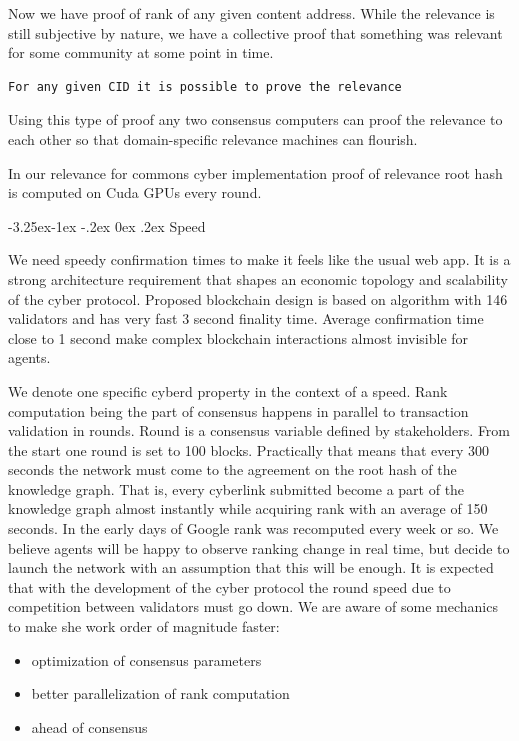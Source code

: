 \documentclass[8pt,oneside]{amsart}
\makeatletter
\newcommand{\linkred}[2]{\href{#1}{\color{red}{#2}}}
\newcommand{\linkgreen}[2]{\href{#1}{\color{green}{#2}}}
\renewcommand\subsection{\@startsection{subsection}{2}{\z@}%
                                     {-3.25ex\@plus -1ex \@minus -.2ex}%
                                     {0ex \@plus .2ex}%
                                     {\play\Large}}%
\newcommand{\titleSection}[1]{\subsection{#1}}
\newcommand{\code}[1]{{\PlayBold #1}}
\makeatother
\begin{document}
Now we have proof of rank of any given content address. While the relevance is still subjective by nature, we have a collective proof that something was relevant for some community at some point in time.

\begin{lstlisting}
For any given CID it is possible to prove the relevance
\end{lstlisting}

Using this type of proof any two \linkgreen{https://ipfs.io/ipfs/QmdCeixQUHBjGnKfwbB1dxf4X8xnadL8xWmmEnQah5n7x2}{IBC compatible} consensus computers can proof the relevance to each other so that domain-specific relevance machines can flourish.

In our relevance for commons \code{cyber} implementation proof of relevance root hash is computed on Cuda GPUs every round.

\titleSection{Speed}\label{speed-performance}

We need speedy confirmation times to make it feels like the usual web app. It is a strong architecture requirement that shapes an economic topology and scalability of the cyber protocol. Proposed blockchain design is based on \linkgreen{https://ipfs.io/ipfs/QmaMtD7xDgghqgjN62zWZ5TBGFiEjGQtuZBjJ9sMh816KJ}{Tendermint consensus} algorithm with 146 validators and has very fast 3 second finality time. Average confirmation time close to 1 second make complex blockchain interactions almost invisible for agents.

We denote one specific cyberd property in the context of a speed. Rank computation being the part of consensus happens in parallel to transaction validation in rounds. Round is a consensus variable defined by stakeholders. From the start one round is set to 100 blocks. Practically that means that every 300 seconds the network must come to the agreement on the root hash of the knowledge graph. That is, every cyberlink submitted become a part of the knowledge graph almost instantly while acquiring rank with an average of 150 seconds. In the early days of Google rank was recomputed every week or so. We believe agents will be happy to observe ranking change in real time, but decide to launch the network with an assumption that this will be enough. It is expected that with the development of the cyber protocol the round speed due to competition between validators must go down. We are aware of some mechanics to make she work order of magnitude faster:
\begin{itemize}
\item optimization of consensus parameters
\item better parallelization of rank computation
\item \linkred{https://medium.com/solana-labs/proof-of-history-a-clock-for-blockchain-cf47a61a9274}{better clock} ahead of consensus
\end{itemize}
\end{document}
